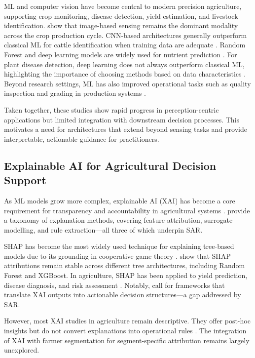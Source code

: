 \documentclass[3p,twocolumn,authoryear]{elsarticle}
\begin{document}
ML and computer vision have become central to modern precision agriculture,
supporting crop monitoring, disease detection, yield estimation, and
livestock identification.
\citet{ghazal2024survey} show that image-based sensing remains the dominant
modality across the crop production cycle.
CNN-based architectures generally outperform classical ML for cattle
identification when training data are adequate
\citep{hossain2022cattle}.
Random Forest and deep learning models are widely used for nutrient
prediction \citep{ennaji2023nutrient}.
For plant disease detection, deep learning does not always outperform
classical ML, highlighting the importance of choosing methods based on
data characteristics \citep{omaye2024disease}.
Beyond research settings, ML has also improved operational tasks such as
quality inspection and grading in production systems
\citep{wonggasem2024}.

Taken together, these studies show rapid progress in perception-centric
applications but limited integration with downstream decision processes.
This motivates a need for architectures that extend beyond sensing tasks
and provide interpretable, actionable guidance for practitioners.

\subsection{Explainable AI for Agricultural Decision Support}

As ML models grow more complex, explainable AI (XAI) has become a core
requirement for transparency and accountability in agricultural systems
\citep{arrieta2020,linardatos2021}.
\citet{guidotti2019} provide a taxonomy of explanation methods, covering
feature attribution, surrogate modelling, and rule extraction---all three
of which underpin SAR.

SHAP has become the most widely used technique for explaining tree-based
models due to its grounding in cooperative game theory \citep{lundberg2017}.
\citet{lundberg2020} show that SHAP attributions remain stable across
different tree architectures, including Random Forest and XGBoost.
In agriculture, SHAP has been applied to yield prediction, disease
diagnosis, and risk assessment \citep{ghosal2018,ryo2022}.
Notably, \citet{ryo2022} call for frameworks that translate XAI outputs
into actionable decision structures---a gap addressed by SAR.

However, most XAI studies in agriculture remain descriptive.
They offer post-hoc insights but do not convert explanations into
operational rules \citep{linardatos2021,arrieta2020}.
The integration of XAI with farmer segmentation for segment-specific
attribution remains largely unexplored.
\end{document}
